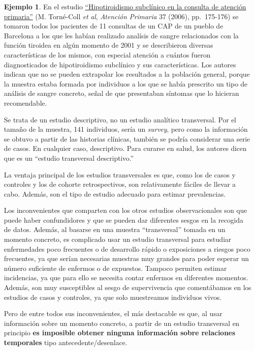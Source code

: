 \documentclass[
]{book}
\theoremstyle{definition}
\theoremstyle{definition}
\newtheorem{example}{Ejemplo}[chapter]
\theoremstyle{definition}
\theoremstyle{definition}
\theoremstyle{remark}
\begin{document}
\begin{example}
\protect\hypertarget{exm:HSsurvey}{}\label{exm:HSsurvey}En el estudio \href{https://www.sciencedirect.com/science/article/pii/S0212656706703237}{``Hipotiroidismo subclínico en la consulta de atención primaria''} (M. Torné-Coll \emph{et al}, \emph{Atención Primaria} 37 (2006), pp.~175-176) se tomaron todos los pacientes de 11 consultas de un CAP de un pueblo de Barcelona a los que les habían realizado analísis de sangre relacionados con la función tiroidea en algún momento de 2001 y se describieron diversas características de los mismos, con especial atención a cuántos fueron diagnosticados de hipotiroidismo subclínico y sus características. Los autores indican que no se pueden extrapolar los resultados a la población general, porque la muestra estaba formada por individuos a los que se había prescrito un tipo de análisis de sangre concreto, señal de que presentaban síntomas que lo hicieran recomendable.
\end{example}

Se trata de un estudio descriptivo, no un estudio analítico transversal. Por el tamaño de la muestra, 141 individuos, sería un \emph{survey}, pero como la información se obtuvo a partir de las historias clínicas, también se podría considerar una serie de casos. En cualquier caso, descriptivo. Para curarse en salud, los autores dicen que es un ``estudio transversal descriptivo.''

La ventaja principal de los estudios transversales es que, como los de casos y controles y los de cohorte retrospectivos, son relativamente fáciles de llevar a cabo. Además, son el tipo de estudio adecuado para estimar prevalencias.

Los inconvenientes que comparten con los otros estudios observacionales son que puede haber confundidores y que se pueden dar diferentes sesgos en la recogida de datos. Además, al basarse en una muestra ``transversal'' tomada en un momento concreto, es complicado usar un estudio transversal para estudiar enfermedades poco frecuentes o de desarrollo rápido o exposiciones a riesgos poco frecuentes, ya que serían necesarias muestras muy grandes para poder esperar un número suficiente de enfermos o de expuestos. Tampoco permiten estimar incidencias, ya que para ello se necesita contar enfermos en diferentes momentos. Además, son muy susceptibles al sesgo de supervivencia que comentábamos en los estudios de casos y controles, ya que solo muestreamos individuos vivos.

Pero de entre todos sus inconvenientes, el más destacable es que, al usar información sobre un momento concreto, a partir de un estudio transversal en principio \textbf{es imposible obtener ninguna información sobre relaciones temporales} tipo antecedente/desenlace.
\end{document}
